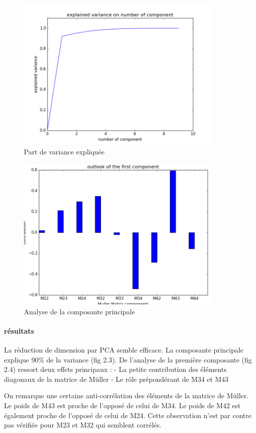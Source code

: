 \documentclass[a4paper,10pt]{report}
\begin{document}
\begin{figure}
  \caption{Part de variance expliquée}
  \centering
  \includegraphics[width=10cm]{PCA_3.png}
\end{figure}
\begin{figure}
  \caption{Analyse de la composante principale}
  \centering
  \includegraphics[width=10cm]{PCA_2.png}
\end{figure}

\paragraph{résultats}
La réduction de dimension par PCA semble efficace. La composante principale explique 90\% de la variance (fig 2.3). 
De l'analyse de la première composante (fig 2.4) ressort deux effets principaux :
- La petite contribution des éléments diagonaux de la matrice de Müller
- Le rôle prépondérant de M34 et M43

On remarque une certaine anti-corrélation des éléments de la matrice de Müller. Le poids de M43 est proche de l'opposé de celui de M34. Le poids de M42 est également proche de l'opposé de celui de M24. Cette observation n'est par contre pas vérifiée pour M23 et M32 qui semblent corrélés.
\end{document}
